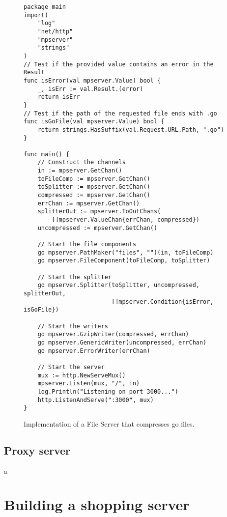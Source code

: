 \documentclass[12pt,a4paper]{article}
\begin{document}
\begin{figure}
\begin{lstlisting}
package main
import(
    "log"
    "net/http"
    "mpserver"
    "strings"
)
// Test if the provided value contains an error in the Result
func isError(val mpserver.Value) bool {
    _, isErr := val.Result.(error)
    return isErr
}
// Test if the path of the requested file ends with .go
func isGoFile(val mpserver.Value) bool {
    return strings.HasSuffix(val.Request.URL.Path, ".go")
}

func main() {
    // Construct the channels
    in := mpserver.GetChan()
    toFileComp := mpserver.GetChan()
    toSplitter := mpserver.GetChan()
    compressed := mpserver.GetChan()
    errChan := mpserver.GetChan()
    splitterOut := mpserver.ToOutChans(
        []mpserver.ValueChan{errChan, compressed})
    uncompressed := mpserver.GetChan()

    // Start the file components
    go mpserver.PathMaker("files", "")(in, toFileComp)
    go mpserver.FileComponent(toFileComp, toSplitter)
    
    // Start the splitter
    go mpserver.Splitter(toSplitter, uncompressed, splitterOut, 
                         []mpserver.Condition{isError, isGoFile})

    // Start the writers
    go mpserver.GzipWriter(compressed, errChan)
    go mpserver.GenericWriter(uncompressed, errChan)
    go mpserver.ErrorWriter(errChan)

    // Start the server
    mux := http.NewServeMux()
    mpserver.Listen(mux, "/", in)
    log.Println("Listening on port 3000...")
    http.ListenAndServe(":3000", mux)
}
\end{lstlisting}
\caption[scale=1.0]{Implementation of a File Server that compresses go files.}
\label{fig:FileServerImpl}
\end{figure}

\subsection{Proxy server}
a

\newpage
\section{Building a shopping server}
\label{sec:shopping}

\newpage
\end{document}
